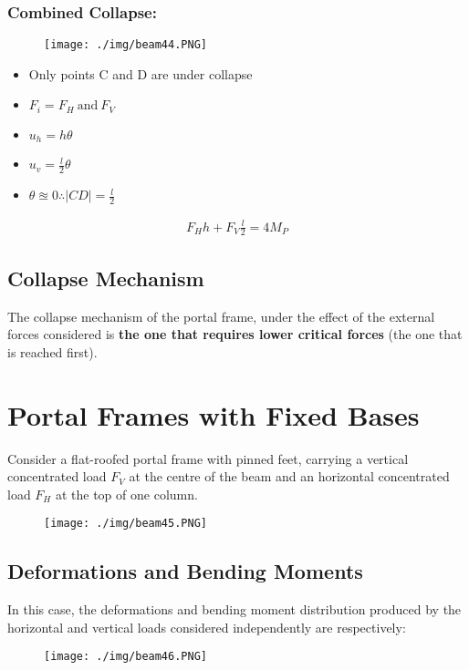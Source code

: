 \subsubsection{Combined Collapse:}
\begin{figure}[H]
  \centering
  \texttt{[image: ./img/beam44.PNG]}
\end{figure}
\begin{itemize}
  \item Only points C and D are under collapse
  \item $F_i = F_H \ \text{and} \ F_V$
  \item $u_h = h\theta$
  \item $u_v = \frac{l}{2}\theta$
  \item $\theta \approxeq 0 \therefore |CD| = \frac{l}{2}$
\end{itemize}
\begin{gather}
  F_Hh + F_V\frac{l}{2} = 4M_P
\end{gather}
\subsection{Collapse Mechanism}
The collapse mechanism of the portal frame, under the effect of the external forces considered is \textbf{the one that requires lower critical forces} (the one that is reached first).
\section{Portal Frames with Fixed Bases}
Consider a flat-roofed portal frame with pinned feet, carrying a vertical concentrated load $F_V$ at the centre of the beam and an horizontal concentrated load $F_H$ at the top of one column.
\begin{figure}[H]
  \centering
  \texttt{[image: ./img/beam45.PNG]}
\end{figure}
\subsection{Deformations and Bending Moments}
In this case, the deformations and bending moment distribution produced by the horizontal and vertical loads considered independently are respectively:
\begin{figure}[H]
  \centering
  \texttt{[image: ./img/beam46.PNG]}
\end{figure}
